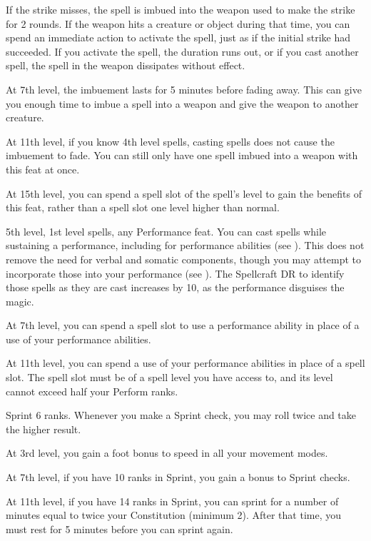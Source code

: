     If the strike misses, the spell is imbued into the weapon used to make the strike for 2 rounds.
    If the weapon hits a creature or object during that time, you can spend an immediate action to activate the spell, just as if the initial strike had succeeded.
    If you activate the spell, the duration runs out, or if you cast another spell, the spell in the weapon dissipates without effect.

    At 7th level, the imbuement lasts for 5 minutes before fading away.
    This can give you enough time to imbue a spell into a weapon and give the weapon to another creature.

    At 11th level, if you know 4th level spells, casting spells does not cause the imbuement to fade.
    You can still only have one spell imbued into a weapon with this feat at once.

    At 15th level, you can spend a spell slot of the spell's level to gain the benefits of this feat, rather than a spell slot one level higher than normal.

    \featpres 5th level, 1st level spells, any Performance feat.
    \featben You can cast spells while sustaining a performance, including for performance abilities (see ).
    This does not remove the need for verbal and somatic components, though you may attempt to incorporate those into your performance (see ).
    The Spellcraft DR to identify those spells as they are cast increases by 10, as the performance disguises the magic.

    At 7th level, you can spend a spell slot to use a performance ability in place of a use of your performance abilities.

    At 11th level, you can spend a use of your performance abilities in place of a spell slot.
    The spell slot must be of a spell level you have access to, and its level cannot exceed half your Perform ranks.

    \featpre Sprint 6 ranks.
    \featben Whenever you make a Sprint check, you may roll twice and take the higher result.

    At 3rd level, you gain a  foot bonus to speed in all your movement modes.

    At 7th level, if you have 10 ranks in Sprint, you gain a  bonus to Sprint checks.

    At 11th level, if you have 14 ranks in Sprint, you can sprint for a number of minutes equal to twice your Constitution (minimum 2).
    After that time, you must rest for 5 minutes before you can sprint again.

